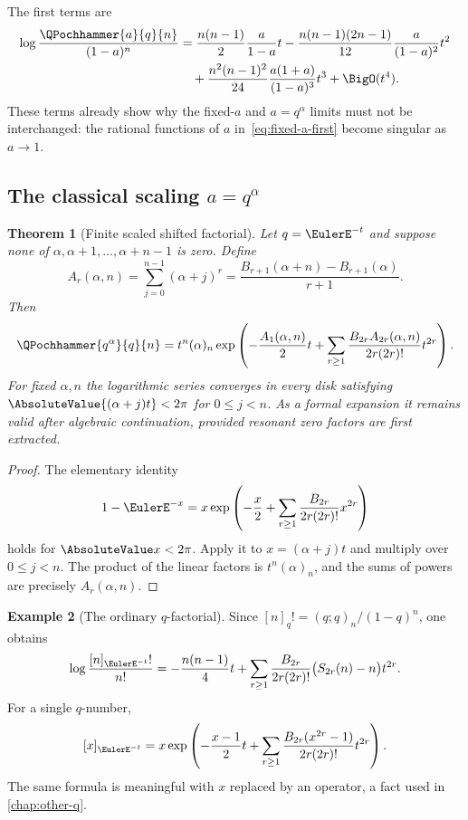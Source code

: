 \documentclass[11pt,oneside]{article}
\newtheorem{theorem}{Theorem}[section]
\theoremstyle{definition}
\newtheorem{example}[theorem]{Example}
\theoremstyle{remark}
\let\reportsubsection\subsection
\let\section\reportsubsection
\begin{document}
The first terms are
\begin{align}
 \log\frac{\QPochhammer{a}{q}{n}}{(1-a)^n}
 &=\frac{n(n-1)}2\frac{a}{1-a}t
 -\frac{n(n-1)(2n-1)}{12}\frac{a}{(1-a)^2}t^2
 \notag\\
 &\quad+\frac{n^2(n-1)^2}{24}
 \frac{a(1+a)}{(1-a)^3}t^3+\BigO(t^4).
 \label{eq:fixed-a-first}
\end{align}
These terms already show why the fixed-$a$ and $a=q^\alpha$ limits must not be
interchanged: the rational functions of $a$ in~\eqref{eq:fixed-a-first} become
singular as $a\to1$.

\section{The classical scaling \texorpdfstring{$a=q^\alpha$}{a = q-alpha}}

\begin{theorem}[Finite scaled shifted factorial]\label{thm:scaled-finite}
Let $q=\EulerE^{-t}$ and suppose none of
$\alpha,\alpha+1,\ldots,\alpha+n-1$ is zero.  Define
\[
 A_r(\alpha,n)=\sum_{j=0}^{n-1}(\alpha+j)^r
 =\frac{B_{r+1}(\alpha+n)-B_{r+1}(\alpha)}{r+1}.
\]
Then
\begin{equation}\label{eq:scaled-finite-log}
 \QPochhammer{q^\alpha}{q}{n}
 =t^n(\alpha)_n
 \exp\left(
 -\frac{A_1(\alpha,n)}2t
 +\sum_{r\ge1}\frac{B_{2r}A_{2r}(\alpha,n)}
 {2r(2r)!}t^{2r}
 \right).
\end{equation}
For fixed $\alpha,n$ the logarithmic series converges in every disk satisfying
$\AbsoluteValue{(\alpha+j)t}<2\pi$ for $0\le j<n$.  As a formal expansion it remains
valid after algebraic continuation, provided resonant zero factors are first
extracted.
\end{theorem}

\begin{proof}
The elementary identity
\begin{equation}\label{eq:basic-one-factor}
 1-\EulerE^{-x}
 =x\exp\left(-\frac x2+
   \sum_{r\ge1}\frac{B_{2r}}{2r(2r)!}x^{2r}\right)
\end{equation}
holds for $\AbsoluteValue x<2\pi$.  Apply it to
$x=(\alpha+j)t$ and multiply over $0\le j<n$.  The product of the linear
factors is $t^n(\alpha)_n$, and the sums of powers are precisely
$A_r(\alpha,n)$.
\end{proof}

\begin{example}[The ordinary $q$-factorial]
Since
\(
[n]_q!=(q;q)_n/(1-q)^n
\), one obtains
\begin{equation}\label{eq:qfactorial-qone}
 \log\frac{[n]_{\EulerE^{-t}}!}{n!}
 =-\frac{n(n-1)}4t+
 \sum_{r\ge1}\frac{B_{2r}}{2r(2r)!}
 \bigl(S_{2r}(n)-n\bigr)t^{2r}.
\end{equation}
For a single $q$-number,
\begin{equation}\label{eq:qnumber-qone}
 [x]_{\EulerE^{-t}}
 =x\exp\left(
 -\frac{x-1}{2}t+
 \sum_{r\ge1}\frac{B_{2r}(x^{2r}-1)}{2r(2r)!}t^{2r}
 \right).
\end{equation}
The same formula is meaningful with $x$ replaced by an operator, a fact used in
\cref{chap:other-q}.
\end{example}
\end{document}
